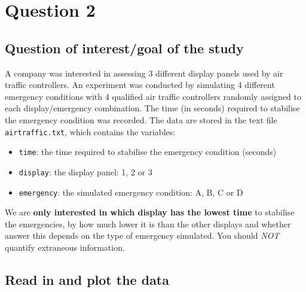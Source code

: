 \documentclass[
]{article}
\newenvironment{Shaded}{\begin{snugshade}}{\end{snugshade}}
\newcommand{\AttributeTok}[1]{\textcolor[rgb]{0.77,0.63,0.00}{#1}}
\newcommand{\ConstantTok}[1]{\textcolor[rgb]{0.00,0.00,0.00}{#1}}
\newcommand{\FunctionTok}[1]{\textcolor[rgb]{0.00,0.00,0.00}{#1}}
\newcommand{\NormalTok}[1]{#1}
\newcommand{\OtherTok}[1]{\textcolor[rgb]{0.56,0.35,0.01}{#1}}
\newcommand{\SpecialCharTok}[1]{\textcolor[rgb]{0.00,0.00,0.00}{#1}}
\newcommand{\StringTok}[1]{\textcolor[rgb]{0.31,0.60,0.02}{#1}}
\providecommand{\tightlist}{%
  \setlength{\itemsep}{0pt}\setlength{\parskip}{0pt}}
\begin{document}
\newpage

\hypertarget{question-2}{%
\section{Question 2}\label{question-2}}

\hypertarget{question-of-interestgoal-of-the-study-1}{%
\subsection{Question of interest/goal of the
study}\label{question-of-interestgoal-of-the-study-1}}

A company was interested in assessing 3 different display panels used by
air traffic controllers. An experiment was conducted by simulating 4
different emergency conditions with 4 qualified air traffic controllers
randomly assigned to each display/emergency combination. The time (in
seconds) required to stabilise the emergency condition was recorded. The
data are stored in the text file \texttt{airtraffic.txt}, which contains
the variables:

\begin{itemize}
\tightlist
\item
  \texttt{time}: the time required to stabilise the emergency condition
  (seconds)
\item
  \texttt{display}: the display panel: 1, 2 or 3
\item
  \texttt{emergency}: the simulated emergency condition: A, B, C or D
\end{itemize}

We are \textbf{only interested in which display has the lowest time} to
stabilise the emergencies, by how much lower it is than the other
displays and whether answer this depends on the type of emergency
simulated. You should \emph{NOT} quantify extraneous information.

\hypertarget{read-in-and-plot-the-data}{%
\subsection{Read in and plot the data}\label{read-in-and-plot-the-data}}

\begin{Shaded}
\end{Shaded}
\end{document}
